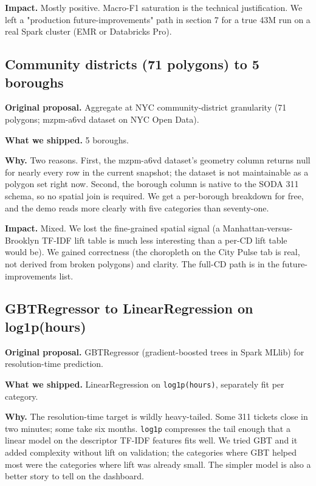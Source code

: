 \documentclass[11pt,letterpaper]{article}
\begin{document}
\textbf{Impact.} Mostly positive. Macro-F1 saturation is the technical justification. We left a "production future-improvements" path in section 7 for a true 43M run on a real Spark cluster (EMR or Databricks Pro).

\subsection{Community districts (71 polygons) to 5 boroughs}

\textbf{Original proposal.} Aggregate at NYC community-district granularity (71 polygons; mzpm-a6vd dataset on NYC Open Data).

\textbf{What we shipped.} 5 boroughs.

\textbf{Why.} Two reasons. First, the mzpm-a6vd dataset's geometry column returns null for nearly every row in the current snapshot; the dataset is not maintainable as a polygon set right now. Second, the borough column is native to the SODA 311 schema, so no spatial join is required. We get a per-borough breakdown for free, and the demo reads more clearly with five categories than seventy-one.

\textbf{Impact.} Mixed. We lost the fine-grained spatial signal (a Manhattan-versus-Brooklyn TF-IDF lift table is much less interesting than a per-CD lift table would be). We gained correctness (the choropleth on the City Pulse tab is real, not derived from broken polygons) and clarity. The full-CD path is in the future-improvements list.

\subsection{GBTRegressor to LinearRegression on log1p(hours)}

\textbf{Original proposal.} GBTRegressor (gradient-boosted trees in Spark MLlib) for resolution-time prediction.

\textbf{What we shipped.} LinearRegression on \texttt{log1p(hours)}, separately fit per category.

\textbf{Why.} The resolution-time target is wildly heavy-tailed. Some 311 tickets close in two minutes; some take six months. \texttt{log1p} compresses the tail enough that a linear model on the descriptor TF-IDF features fits well. We tried GBT and it added complexity without lift on validation; the categories where GBT helped most were the categories where lift was already small. The simpler model is also a better story to tell on the dashboard.
\end{document}
